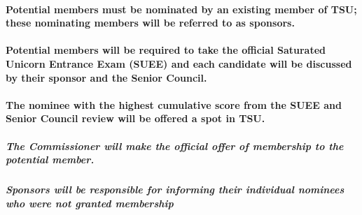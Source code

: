 \documentclass[
]{book}
\begin{document}
\hypertarget{potential-members-must-be-nominated-by-an-existing-member-of-tsu-these-nominating-members-will-be-referred-to-as-sponsors.}{%
\paragraph{Potential members must be nominated by an existing member of TSU; these nominating members will be referred to as sponsors.}\label{potential-members-must-be-nominated-by-an-existing-member-of-tsu-these-nominating-members-will-be-referred-to-as-sponsors.}}

\hypertarget{potential-members-will-be-required-to-take-the-official-saturated-unicorn-entrance-exam-suee-and-each-candidate-will-be-discussed-by-their-sponsor-and-the-senior-council.}{%
\paragraph{Potential members will be required to take the official Saturated Unicorn Entrance Exam (SUEE) and each candidate will be discussed by their sponsor and the Senior Council.}\label{potential-members-will-be-required-to-take-the-official-saturated-unicorn-entrance-exam-suee-and-each-candidate-will-be-discussed-by-their-sponsor-and-the-senior-council.}}

\hypertarget{the-nominee-with-the-highest-cumulative-score-from-the-suee-and-senior-council-review-will-be-offered-a-spot-in-tsu.}{%
\paragraph{The nominee with the highest cumulative score from the SUEE and Senior Council review will be offered a spot in TSU.}\label{the-nominee-with-the-highest-cumulative-score-from-the-suee-and-senior-council-review-will-be-offered-a-spot-in-tsu.}}

\hypertarget{the-commissioner-will-make-the-official-offer-of-membership-to-the-potential-member.}{%
\subparagraph{The Commissioner will make the official offer of membership to the potential member.}\label{the-commissioner-will-make-the-official-offer-of-membership-to-the-potential-member.}}

\hypertarget{sponsors-will-be-responsible-for-informing-their-individual-nominees-who-were-not-granted-membership}{%
\subparagraph{Sponsors will be responsible for informing their individual nominees who were not granted membership}\label{sponsors-will-be-responsible-for-informing-their-individual-nominees-who-were-not-granted-membership}}
\end{document}
